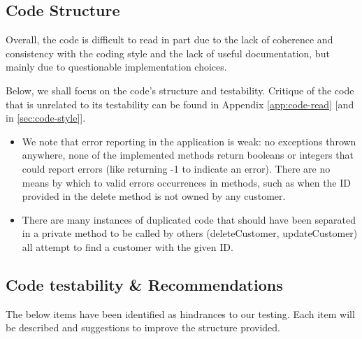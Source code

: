 
\subsection{Code Structure} 
Overall, the code is difficult to read in part due to the lack of coherence and consistency with the coding style and the lack of useful documentation, but mainly due to questionable implementation choices. 

Below, we shall focus on the code's structure and testability. Critique of the code that is unrelated to its testability can be found in Appendix \ref{app:code-read} [and in \ref{sec:code-style}]. 

\begin{itemize}
	\item We note that error reporting in the application is weak: no exceptions thrown anywhere, none of the implemented methods return booleans or integers that could report errors (like returning -1 to indicate an error). There are no means by which  to valid errors occurrences in methods, such as when the ID provided in the delete method is not owned by any customer. 
	\item There are many instances of duplicated code that should have been separated in a private method to be called by others (deleteCustomer, updateCustomer) all attempt to find a customer with the given ID. 
\end{itemize}

\subsection{Code testability \& Recommendations}

The below items have been identified as hindrances to our testing. Each item will be described and suggestions to improve the structure provided. 

